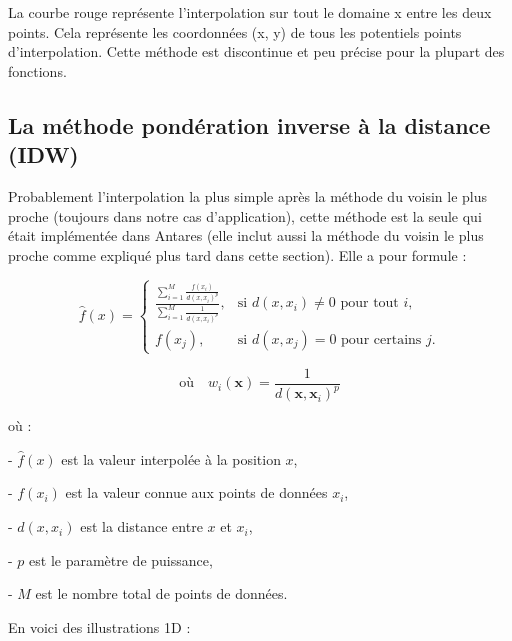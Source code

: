 La courbe rouge représente l'interpolation sur tout le domaine x entre les deux points. Cela représente les coordonnées (x, y) de tous les potentiels points d'interpolation.
Cette méthode est discontinue et peu précise pour la plupart des fonctions.



\subsection{La méthode pondération inverse à la distance (IDW)} %

Probablement l'interpolation la plus simple après la méthode du voisin le plus proche (toujours dans notre cas d'application), cette méthode est la seule qui était implémentée dans Antares (elle inclut aussi la méthode du voisin le plus proche comme expliqué plus tard dans cette section). Elle a pour formule :

\[
\hat{f}(x) = 
\begin{cases}
\frac{\sum_{i=1}^{M} \frac{f(x_i)}{d(x, x_i)^p}}{\sum_{i=1}^{M} \frac{1}{d(x, x_i)^p}}, & \text{si } d(x, x_i) \neq 0 \text{ pour tout } i, \\ 
f(x_j), & \text{si } d(x, x_j) = 0 \text{ pour certains } j.
\end{cases}
\]

\[
\text{où} \quad w_i(\mathbf{x}) = \frac{1}{d(\mathbf{x}, \mathbf{x}_i)^p}
\]


où :

- \(\hat{f}(x)\) est la valeur interpolée à la position \(x\),

- \(f(x_i)\) est la valeur connue aux points de données \(x_i\),

- \(d(x, x_i)\) est la distance entre \(x\) et \(x_i\),

- \(p\) est le paramètre de puissance,

- \(M\) est le nombre total de points de données.


En voici des illustrations 1D :

